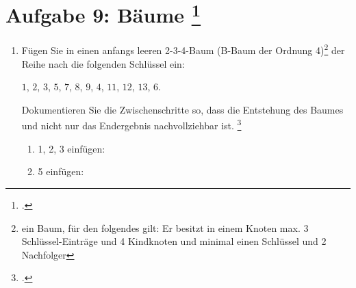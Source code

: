 \documentclass{lehramt-informatik-aufgabe}
\begin{document}

\section{Aufgabe 9: Bäume
\footcite[entnommen aus Algorithmen und
Datenstrukturen, Übungsblatt 6, Universität Würzburg]{aud:pu:7}}

\begin{enumerate}


\item Fügen Sie in einen anfangs leeren 2-3-4-Baum (B-Baum der Ordnung
4)\footnote{ein Baum, für den folgendes gilt: Er besitzt in einem Knoten
max. 3 Schlüssel-Einträge und 4 Kindknoten und minimal einen Schlüssel
und 2 Nachfolger} der Reihe nach die folgenden Schlüssel ein:

\centerline{$1$, $2$, $3$, $5$, $7$, $8$, $9$, $4$, $11$, $12$, $13$, $6$.}

Dokumentieren Sie die Zwischenschritte so,
dass die Entstehung des Baumes und nicht nur das Endergebnis
nachvollziehbar ist. \footcite[Staatsexamen Theoretische Informatik,
Algorithmen und Datenstrukturen, Realschulen, Frühjahr 2011, Thema 1
Aufgabe 3]{examen:46115:2011:03}

\begin{liAntwort}
\begin{multicols}{2}
\begin{enumerate}

%

\item 1, 2, 3 einfügen:


%

\item 5 einfügen:



\end{enumerate}
\end{multicols}
\end{liAntwort}
\end{enumerate}
\end{document}
